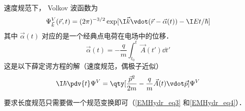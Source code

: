 
速度规范下， Volkov 波函数为
 \begin{equation}
\Psi_{\vec k}^V(\vec r, t) = (2\pi)^{-3/2} \exp[\I \vec k \vdot (\vec r - \vec \alpha(t)) - \I Et/\hbar]
\end{equation}
其中 $\vec \alpha(t)$ 对应的是一个经典点电荷在电场中的位移．
\begin{equation}
\vec \alpha(t) = -\frac{q}{m} \int_{t_0}^t \vec A(t') \dd{t'}
\end{equation}
这是以下薛定谔方程的解（速度规范，偶极子近似）
\begin{equation}
\I\hbar \pdv{t} \Psi^V = \qty[\frac{\vec p^2}{2m} - \frac{q}{m}\vec A(t) \vdot \vec p] \Psi^V
\end{equation}

要求长度规范只需要做一个规范变换即可（\autoref{EMHydr_eq3} 和\autoref{EMHydr_eq4}）．
